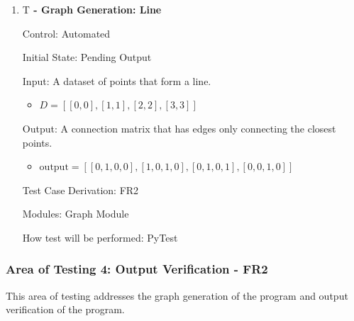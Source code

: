 \documentclass[12pt, titlepage]{article}
\newcounter{testnum} %
\begin{document}
\begin{enumerate}
Output: A connection matrix that has edges only on the edge of the square.
\begin{itemize}
    \item $\mbox{output} = [[0, 1, 1, 0], [1, 0, 0, 1], [1, 0, 0, 1], [0, 1, 1, 0]]$
\end{itemize}

Test Case Derivation: FR2

Modules: Graph Module

How test will be performed: PyTest

\item{T\thetestnum \textbf{\label{T:out big} 
 - Graph Generation: Line}}

Control: Automated
					
Initial State: Pending Output
					
Input: A dataset of points that form a line.
\begin{itemize}
    \item $D = [[0, 0], [1, 1], [2, 2], [3, 3]]$
\end{itemize}
					
Output: A connection matrix that has edges only connecting the closest points.
\begin{itemize}
    \item $\mbox{output} = [[0, 1, 0, 0], [1, 0, 1, 0], [0, 1, 0, 1], [0, 0, 1, 0]]$
\end{itemize}

Test Case Derivation: FR2

Modules: Graph Module

How test will be performed: PyTest
\end{enumerate}

\subsubsection{Area of Testing 4: Output Verification - FR2}
This area of testing addresses the graph generation of the program and output verification of the program.
\end{document}
